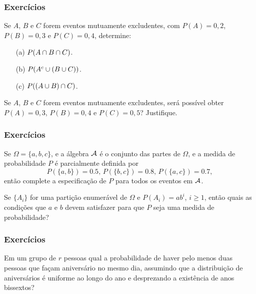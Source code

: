 \begin{frame}
\frametitle{\textbf{Exercícios}}
\baselineskip=13pt
\begin{block}{}
	
	
	
	\begin{example}
		Se $A$, $B$ e $C$ forem eventos mutuamente excludentes, com $P(A)=0{,}2$, $P(B)=0{,}3$ e $P(C)=0{,}4$, determine:
		\begin{enumerate}
			\item[(a)] $P(A\cap B\cap C)$.
			\item[(b)] $P(A^c\cup(B\cup C))$.
			\item[(c)] $P((A\cup B)\cap C)$.
		\end{enumerate}
		
	\end{example}
	
	\begin{example}
		Se $A$, $B$ e $C$ forem eventos mutuamente excludentes, será possível obter $P(A)=0{,}3$, $P(B)=0{,}4$ e $P(C)=0{,}5$? Justifique.
	\end{example}
	
\end{block}
\end{frame}


\begin{frame}
\frametitle{\textbf{Exercícios}}
\baselineskip=13pt

\begin{example}
Se $\Omega=\{a,b,c\}$, e a álgebra ${\cal A}$ é o conjunto das partes de
$\Omega$, e a medida de probabilidade $P$ é parcialmente definida
por
$$P(\{a,b\})=0.5\mbox{,  }P(\{b,c\})=0.8\mbox{,  }P(\{a,c\})=0.7,$$
então complete a especificação de $P$ para todos os eventos em ${\cal A}$.
\end{example}

\begin{example}
Se $\{A_i\}$ for uma partição enumerável de $\Omega$ e
$P(A_i)=ab^i$, $i\geq 1$, então quais as condições que $a$ e $b$
devem satisfazer para que $P$ seja uma medida de probabilidade?
\end{example}

\end{frame}

\begin{frame}
\frametitle{\textbf{Exercícios}}
\baselineskip=13pt


\begin{example}
Em um grupo de $r$ pessoas qual a probabilidade de haver pelo menos
duas pessoas que façam aniversário no mesmo dia, assumindo que a
distribuição de aniversários é uniforme ao longo do ano e
desprezando a existência de anos bissextos?
\end{example}

\end{frame}

